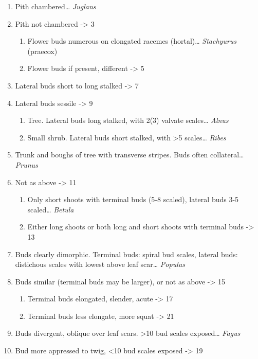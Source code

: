 \documentclass[openany]{book}
\providecommand{\tightlist}{%
  \setlength{\itemsep}{0pt}\setlength{\parskip}{0pt}}
\begin{document}
\begin{enumerate}
\def\labelenumi{\arabic{enumi}.}
\tightlist
\item
  Pith chambered\ldots{} \emph{Juglans}
\item
  Pith not chambered -\textgreater{} 3

  \begin{enumerate}
  \def\labelenumii{\arabic{enumii}.}
  \setcounter{enumii}{2}
  \tightlist
  \item
    Flower buds numerous on elongated racemes (hortal)\ldots{}
    \emph{Stachyurus} (praecox)
  \item
    Flower buds if present, different -\textgreater{} 5
  \end{enumerate}
\item
  Lateral buds short to long stalked -\textgreater{} 7
\item
  Lateral buds sessile -\textgreater{} 9

  \begin{enumerate}
  \def\labelenumii{\arabic{enumii}.}
  \setcounter{enumii}{6}
  \tightlist
  \item
    Tree. Lateral buds long stalked, with 2(3) valvate scales\ldots{}
    \emph{Alnus}
  \item
    Small shrub. Lateral buds short stalked, with \textgreater{}5
    scales\ldots{} \emph{Ribes}
  \end{enumerate}
\item
  Trunk and boughs of tree with transverse stripes. Buds often
  collateral\ldots{} \emph{Prunus}
\item
  Not as above -\textgreater{} 11

  \begin{enumerate}
  \def\labelenumii{\arabic{enumii}.}
  \setcounter{enumii}{10}
  \tightlist
  \item
    Only short shoots with terminal buds (5-8 scaled), lateral buds 3-5
    scaled\ldots{} \emph{Betula}
  \item
    Either long shoots or both long and short shoots with terminal buds
    -\textgreater{} 13
  \end{enumerate}
\item
  Buds clearly dimorphic. Terminal buds: spiral bud scales, lateral
  buds: distichous scales with lowest above leaf scar\ldots{}
  \emph{Populus}
\item
  Buds similar (terminal buds may be larger), or not as above
  -\textgreater{} 15

  \begin{enumerate}
  \def\labelenumii{\arabic{enumii}.}
  \setcounter{enumii}{14}
  \tightlist
  \item
    Terminal buds elongated, slender, acute -\textgreater{} 17
  \item
    Terminal buds less elongate, more squat -\textgreater{} 21
  \end{enumerate}
\item
  Buds divergent, oblique over leaf scars. \textgreater{}10 bud scales
  exposed\ldots{} \emph{Fagus}
\item
  Bud more appressed to twig, \textless{}10 bud scales exposed
  -\textgreater{} 19


\end{enumerate}
\end{document}
